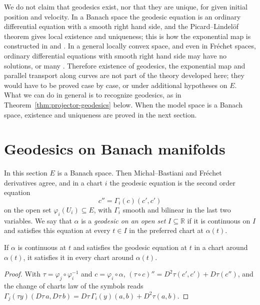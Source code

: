 \begin{remark}
  \label{rem:conn-no-existence}
  We do not claim that geodesics exist, nor that they are unique, for given initial position and
  velocity. In a Banach space the geodesic equation is an ordinary differential equation with a
  smooth right hand side, and the Picard--Lindel\"of theorem gives local existence and
  uniqueness; this is how the exponential map is constructed in \cite{Lan99} and \cite{Lar22}.
  In a general locally convex space, and even in Fr\'echet spaces, ordinary differential equations
  with smooth right hand side may have no solutions, or many \cite[Part~I, 5.6.1]{Ham82}. Therefore existence of geodesics,
  the exponential map and parallel transport along curves are not part of the theory developed
  here; they would have to be proved case by case, or under additional hypotheses on $E$.
  What we can do in general is to recognize geodesics, as in Theorem~\ref{thm:projector-geodesics}
  below. When the model space is a Banach space, existence and uniqueness are proved in the next
  section.
\end{remark}

\section{Geodesics on Banach manifolds}

In this section $E$ is a Banach space. Then Michal--Bastiani and Fr\'echet derivatives agree, and
in a chart $i$ the geodesic equation is the second order equation
\[
  c'' = \Gamma_i(c)(c', c')
\]
on the open set $\varphi_i(U_i) \subseteq E$, with $\Gamma_i$ smooth and bilinear in the last two
variables. We say that $\alpha$ is a \emph{geodesic on an open set} $I \subseteq \mathbb{R}$ if it is
continuous on $I$ and satisfies this equation at every $t \in I$ in the preferred chart at
$\alpha(t)$.

\begin{theorem}
  \label{thm:geodesic-eq-chart}
  \leanok
  If $\alpha$ is continuous at $t$ and satisfies the geodesic equation at $t$ in a chart around
  $\alpha(t)$, it satisfies it in every chart around $\alpha(t)$.
\end{theorem}

\begin{proof}
  \leanok
  With $\tau = \varphi_j \circ \varphi_i^{-1}$ and $c = \varphi_i \circ \alpha$,
  $(\tau \circ c)'' = D^2\tau(c', c') + D\tau(c'')$, and the change of charts law of the symbols
  reads $\Gamma_j(\tau y)(D\tau\, a, D\tau\, b) = D\tau\, \Gamma_i(y)(a, b) + D^2\tau(a, b)$.
\end{proof}

